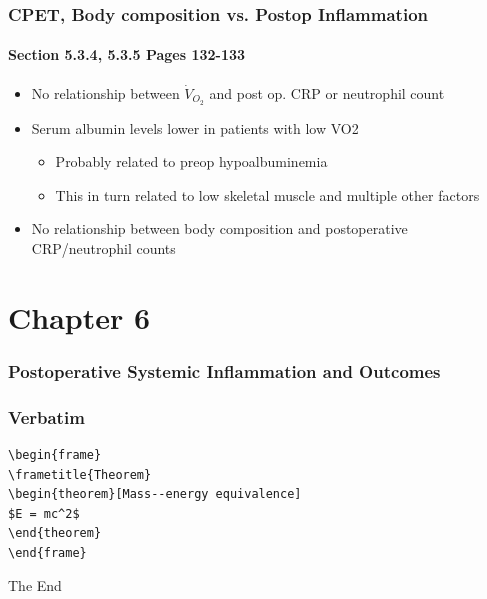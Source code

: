 \documentclass[10pt]{beamer}
\begin{document}
\begin{frame}
	\frametitle{CPET, Body composition vs. Postop Inflammation }
	\framesubtitle{Section 5.3.4, 5.3.5 Pages 132-133 }
	\begin{itemize}
		\item No relationship between $\dot{V}_{O_2}$ and post op. CRP or neutrophil count
		\item Serum albumin levels lower in patients with low VO2
		\begin{itemize}
			\item Probably related to preop hypoalbuminemia
			\item This in turn related to low skeletal muscle and multiple other factors
		\end{itemize}
		\item No relationship between body composition and postoperative CRP/neutrophil counts
	\end{itemize}
\end{frame}


\section{Chapter 6}
\begin{frame}
	\frametitle{Postoperative Systemic Inflammation and Outcomes}
\end{frame}








\begin{frame}[fragile] %
\frametitle{Verbatim}
\begin{example}
\begin{verbatim}
\begin{frame}
\frametitle{Theorem}
\begin{theorem}[Mass--energy equivalence]
$E = mc^2$
\end{theorem}
\end{frame}\end{verbatim}
\end{example}
\end{frame}



\begin{frame}
\Huge{\centerline{The End}}
\end{frame}

\end{document}
